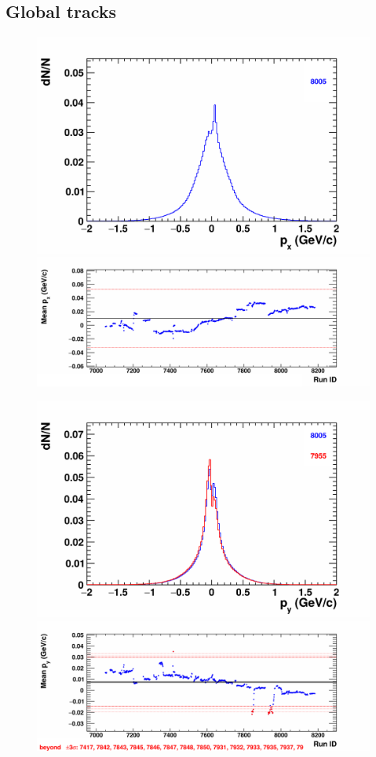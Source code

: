\subsection{Global tracks}

    \begin{figure}[H]
        \begin{center}
            \includegraphics[width=0.35\linewidth]{../pict/QA_RunByRun_24.12/H1/nVtxTr_h2_RunId_tr_px.png}
            \includegraphics[width=0.60\linewidth]{../pict/QA_RunByRun_24.12/nVtxTr_h2_RunId_tr_px.png}

            \includegraphics[width=0.35\linewidth]{../pict/QA_RunByRun_24.12/H1/nVtxTr_h2_RunId_tr_py.png}
            \includegraphics[width=0.60\linewidth]{../pict/QA_RunByRun_24.12/nVtxTr_h2_RunId_tr_py.png}


\end{center}
\end{figure}
